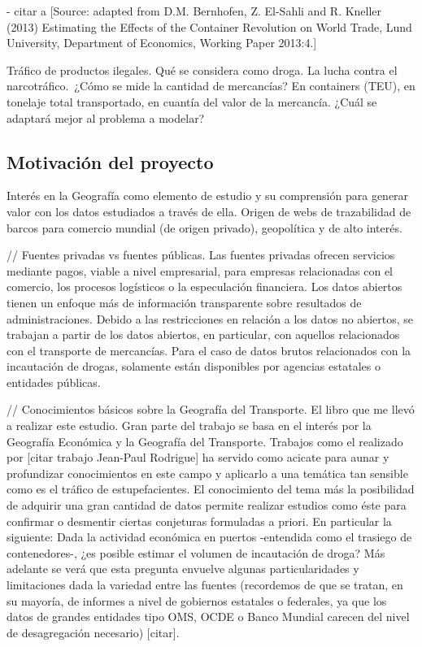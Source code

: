 \documentclass{article}
\begin{document}
- citar a [Source: adapted from D.M. Bernhofen, Z. El-Sahli and R. Kneller (2013) Estimating the Effects of the Container Revolution on World Trade, Lund University, Department of Economics, Working Paper 2013:4.]\

Tráfico de productos ilegales. Qué se considera como droga. La lucha contra el narcotráfico.\
¿Cómo se mide la cantidad de mercancías? En containers (TEU), en tonelaje total transportado, en
cuantía del valor de la mercancía. ¿Cuál se adaptará mejor al problema a modelar?\

\subsection{Motivación del proyecto}
Interés en la Geografía como elemento de estudio y su comprensión para generar valor con los datos estudiados a través de ella.
Origen de webs de trazabilidad de barcos para comercio mundial (de origen privado), geopolítica y de alto interés.

// Fuentes privadas vs fuentes públicas. Las fuentes privadas ofrecen servicios mediante pagos, viable a nivel empresarial, para empresas relacionadas con el comercio, los procesos logísticos o la especulación financiera. Los datos abiertos tienen un enfoque más de información transparente sobre resultados de administraciones. Debido a las restricciones en relación a los datos no abiertos, se trabajan a partir de los datos abiertos, en particular, con aquellos relacionados con el transporte de mercancías. Para el caso de datos brutos relacionados con la incautación de drogas, solamente están disponibles por agencias estatales o entidades públicas.

// Conocimientos básicos sobre la Geografía del Transporte. El libro que me llevó a realizar este estudio.
Gran parte del trabajo se basa en el interés por la Geografía Económica y la Geografía del Transporte. Trabajos como el realizado por [citar trabajo Jean-Paul Rodrigue] ha servido como acicate para aunar y profundizar conocimientos en este campo y aplicarlo a una temática tan sensible como es el tráfico de estupefacientes. El conocimiento del tema más la posibilidad de adquirir una gran cantidad de datos permite realizar estudios como éste para confirmar o desmentir ciertas conjeturas formuladas a priori. En particular la siguiente: Dada la actividad económica en puertos -entendida como el trasiego de contenedores-, ¿es posible estimar el volumen de incautación de droga? Más adelante se verá que esta pregunta envuelve algunas particularidades y limitaciones dada la variedad entre las fuentes (recordemos de que se tratan, en su mayoría, de informes a nivel de gobiernos estatales o federales, ya que los datos de grandes entidades tipo OMS, OCDE o Banco Mundial carecen del nivel de desagregación necesario) [citar].
\end{document}
